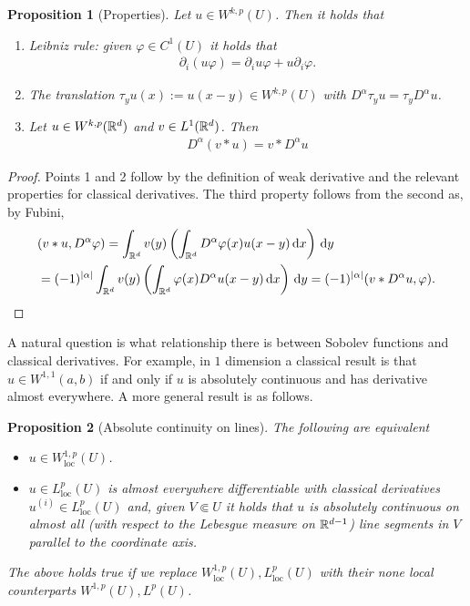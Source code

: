 \documentclass[12pt]{article}
\newtheorem{proposition}{Proposition}
\theoremstyle{remark}
\newcommand{\qt}[1]{\left(#1\right)}
\renewcommand{\d}{\,\mathrm{d}}
\begin{document}
\begin{proposition}[Properties]\label{properties}Let $u \in W^{k,p}(U)$. Then it holds that
	\begin{enumerate}

		\item Leibniz rule: given $\varphi \in C^1(U)$ it holds that
		      \begin{align*}
			      \partial _{i} (u \varphi)= \partial_i u \varphi+ u \partial _i \varphi .
		      \end{align*}

		\item The translation $\tau_y u(x):=u(x-y) \in W^{k,p}(U)$ with $D^\alpha \tau_y u = \tau_y D^\alpha u$.
		\item  Let $u \in W^{k,p}(\mathbb{R}^d)$ and $v \in L^1(\mathbb{R}^d)$. Then
		      \begin{align*}
			      D^\alpha (v*u)= v* D^\alpha u
		      \end{align*}
	\end{enumerate}
\end{proposition}
\begin{proof}
	Points 1 and 2 follow by the definition of weak derivative and the relevant properties for classical derivatives. The third property follows from the second as, by Fubini,
	\begin{align*}
		 & (v*u,D^\alpha\varphi )  = \int_{\R^d}v(y)\qt{\int_{\R^d}D^\alpha \varphi(x) u(x-y) \d x } \d y \\&
		=(-1)^{\abs{\alpha} } \int_{\R^d}v(y)  \qt{\int_{\R^d}\varphi(x) D^\alpha u(x-y) \d x } \d y             =(-1)^{\abs{\alpha} }(v*D^\alpha u, \varphi).
	\end{align*}
\end{proof}
A natural question is what relationship there is between Sobolev functions and classical derivatives. For example, in $1$ dimension a classical result is that  $u \in W^{1,1}(a,b)$ if and only if $u$ is absolutely continuous and has derivative almost everywhere. A more general result is as follows.
\begin{proposition}[Absolute continuity on lines] The following are equivalent
	\begin{itemize}
		\item $u \in W^{1,p}_{\mathrm{loc}}(U)$.
		\item $u \in L^p_{\mathrm{loc}}(U)$ is almost everywhere differentiable with classical derivatives $u^{(i)} \in L^p_{\mathrm{loc}}(U)$ and, given $V \Subset U$ it holds that $u$ is absolutely continuous on almost all (with respect to the Lebesgue measure on $\mathbb{R}^{d-1}$) line segments in $V$ parallel to the coordinate axis.
	\end{itemize}
	The above holds true if we replace $W^{1,p}_{\mathrm{loc}}(U),L^p_{\mathrm{loc}}(U)$ with their none local counterparts $W^{1,p}(U),L^p(U)$.
\end{proposition}
\end{document}
